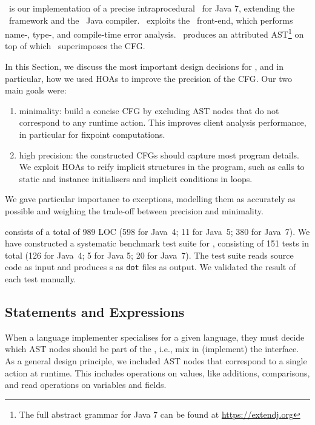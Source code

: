 \intraj\ is our implementation of a precise intraprocedural \CFG\ for Java 7, extending the \intracfg\ framework and the \extendj\ Java compiler.
\intraj\ exploits the \extendj\ front-end, which performs name-, type-, and compile-time error analysis.
\extendj\ produces an attributed AST\footnote{The full abstract grammar for Java 7 can be found at \url{https://extendj.org}} on top of which \intraj\ superimposes the CFG.

In this Section, we discuss the most important design
decisions for \intraj, and in particular, how we used HOAs to improve the precision of the CFG.
Our two main goals were:
\begin{enumerate}
\item minimality: build a concise CFG by excluding AST nodes that do not correspond to any runtime action.
This improves client analysis performance, in particular for fixpoint computations.
\item high precision: the constructed CFGs should capture most program details.
We exploit HOAs to reify implicit structures in the program, such as
calls to static and instance initialisers and implicit conditions in  loops.
\end{enumerate}
We gave particular importance to exceptions, modelling them as accurately as
possible and weighing the trade-off between precision and minimality.

{\intraj} consists of a total of 989 LOC (598 for Java~4; 11 for Java~5; 380 for Java~7).
We have constructed a systematic benchmark test suite for {\intraj}, consisting of 151 tests in total
(126 for Java~4; 5 for Java 5; 20 for Java~7).
The test suite reads source code as input and produces {\CFG}s as \texttt{dot} files as output.
We validated the result of each test manually.

\subsection{Statements and Expressions}
\label{sec:stmtexp}
When a language implementer specialises \intracfg{} for a given language,
they must decide which AST nodes should be part of the \CFG, i.e., mix in (implement) the  interface.
As a general design principle, we included AST nodes that correspond to a single action at runtime.
This includes operations on values, like additions, comparisons,
and read operations on variables and fields.

